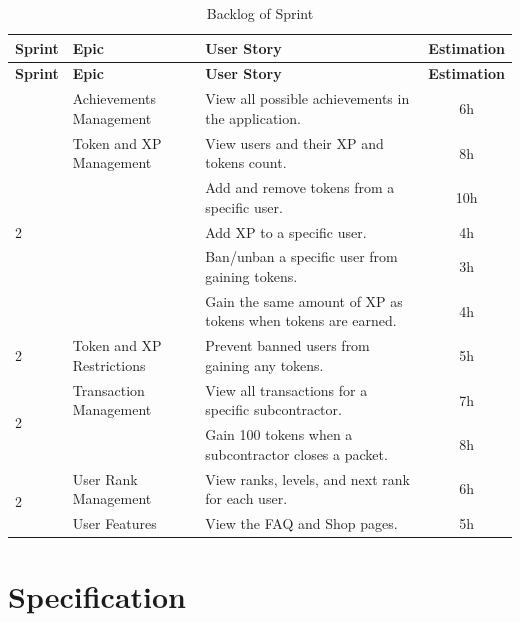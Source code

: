 \begin{longtable}{ | m{} | m{} | m{} | c | }
    \caption{Backlog of Sprint} \\
    \hline
    \rowcolor{primary} \textbf{Sprint} & \textbf{Epic} & \textbf{User Story} & \textbf{Estimation} \\
    \hline
    \endfirsthead
    \hline
    \textbf{Sprint} & \textbf{Epic} & \textbf{User Story} & \textbf{Estimation} \\
    \hline
    \endhead
    \hline
    \endfoot
    \endlastfoot
    2 & Achievements Management & View all possible achievements in the application. & 6h \\
    \hline
    \multirow{5}{*}{2} & Token and XP Management & View users and their XP and tokens count. & 8h \\
    \cline{3-4}
    & & Add and remove tokens from a specific user. & 10h \\
    \cline{3-4}
    & & Add XP to a specific user. & 4h \\
    \cline{3-4}
    & & Ban/unban a specific user from gaining tokens. & 3h \\
    \cline{3-4}
    & & Gain the same amount of XP as tokens when tokens are earned. & 4h \\
    \hline
    2 & Token and XP Restrictions & Prevent banned users from gaining any tokens. & 5h \\
    \hline
    \multirow{2}{*}{2} & Transaction Management & View all transactions for a specific subcontractor. & 7h \\
    \cline{3-4}
    & & Gain 100 tokens when a subcontractor closes a packet. & 8h \\
    \hline
    \multirow{2}{*}{2} & User Rank Management & View ranks, levels, and next rank for each user. & 6h \\
    \hline
    \multirow{2}{*}{2} & User Features & View the FAQ and Shop pages. & 5h \\
    \hline
\end{longtable}


\section{Specification}

